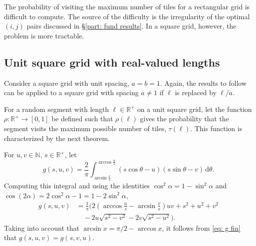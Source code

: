 \documentclass[12pt, a4paper]{article}
\newcommand{\diff}{\mathrm d}
\newcommand{\funt}{\tau} %
\newcommand{\probmax}{\rho} %
\newcommand{\len}{\ell} %
\newcommand{\genvar}{s}
\begin{document}
The probability of visiting the maximum number of tiles for a rectangular grid is difficult to compute. The source of the difficulty is the irregularity of the optimal $(i,j)$ pairs discussed in \S\ref{part: fund results}. In a square grid, however, the problem is more tractable.


\subsection{Unit square grid with real-valued lengths}
\label{part: probmax: unit square grid, real lengths}

Consider a square grid with unit spacing, $a=b=1$. Again, the results to follow can be applied to a square grid with spacing $a \neq 1$ if $\len$ is replaced by $\len/a$.

For a random segment with length $\len \in \mathbb R^+$ on a unit square grid, let the function $\probmax: \mathbb R^+ \to [0,1]$ be defined such that $\probmax(\len)$ gives the probability that the segment visits the maximum possible number of tiles, $\funt(\len)$. This function is characterized by the next theorem.

For $u, v \in \mathbb N$, $\genvar \in \mathbb R^+$, let
\begin{equation}
\label{eq: g def}
g(\genvar, u, v) = \frac 2 \pi \int_{\arcsin \frac v {\genvar}}^{\arccos \frac u {\genvar}} \left( \genvar \cos \theta - u \right) \left( \genvar \sin \theta - v \right) \, \diff \theta.
\end{equation}
Computing this integral and using the identities $\cos^2 \alpha = 1-\sin^2 \alpha$ and $\cos(2\alpha) = 2\cos^2\alpha-1 = 1 - 2\sin^2\alpha$,
\begin{equation}
\label{eq: g fin}
\begin{split}
g(\genvar, u, v) &= \frac 1 {\pi} \biggl(
2\left(\arccos\frac{u}{\genvar}-\arcsin\frac{v}{\genvar}\right) u v + \genvar^2 + u^2 + v^2 \\
& \quad - 2 u \sqrt{\genvar^2-v^2} - 2 v \sqrt{\genvar^2-u^2} \biggr).
\end{split}
\end{equation}
Taking into account that $\arcsin x = \pi/2 - \arccos x$, it follows from \eqref{eq: g fin} that $g(\genvar, u, v) = g(\genvar, v, u)$.
\end{document}
